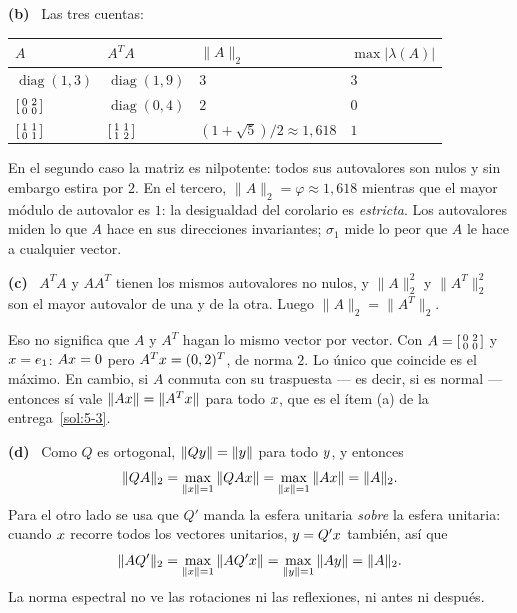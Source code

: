 \documentclass[11pt,a4paper]{article}
\newcommand{\bi}[1]{\boldsymbol{#1}}
\newcommand{\n}[1]{\boldsymbol{#1}}
\DeclareMathOperator{\gen}{span}
\DeclareMathOperator{\tr}{tr}
\DeclareMathOperator{\rg}{rg}
\DeclareMathOperator{\diag}{diag}
\def\n#1{#1}\def\bi#1{#1}\def\rg{rg}\def\tr{tr}\def\gen{span}%
\newcounter{entrega}[section]
\newcommand{\itemsol}[1]{\par\medskip\noindent\textbf{(#1)}\ \ignorespaces}
\begin{document}
\itemsol{b} Las tres cuentas:
\begin{center}
\begin{tabular}{@{}llll@{}}
\hline
$A$ & $A^TA$ & $\|A\|_2$ & $\max|\lambda(A)|$\\
\hline
$\diag(1,3)$ & $\diag(1,9)$ & $3$ & $3$\\
$\begin{bsmallmatrix}0&2\\0&0\end{bsmallmatrix}$ & $\diag(0,4)$ & $2$ & $0$\\
$\begin{bsmallmatrix}1&1\\0&1\end{bsmallmatrix}$ &
$\begin{bsmallmatrix}1&1\\1&2\end{bsmallmatrix}$ &
$(1+\sqrt5)/2\approx1{,}618$ & $1$\\
\hline
\end{tabular}
\end{center}
En el segundo caso la matriz es nilpotente: todos sus autovalores son nulos y sin
embargo estira por $2$. En el tercero, $\|A\|_2=\varphi\approx1{,}618$ mientras
que el mayor módulo de autovalor es $1$: la desigualdad del corolario es
\emph{estricta}. Los autovalores miden lo que $A$ hace en sus direcciones
invariantes; $\sigma_1$ mide lo peor que $A$ le hace a cualquier vector.

\itemsol{c} $A^TA$ y $AA^T$ tienen los mismos autovalores no nulos, y
$\|A\|_2^2$ y $\|A^T\|_2^2$ son el mayor autovalor de una y de la otra. Luego
$\|A\|_2=\|A^T\|_2$.

Eso no significa que $A$ y $A^T$ hagan lo mismo vector por vector. Con
$A=\begin{bsmallmatrix}0&2\\0&0\end{bsmallmatrix}$ y $\bx=\bi{e}_1$: $A\bx=\n0$
pero $A^T\bx=(0,2)^T$, de norma $2$. Lo único que coincide es el máximo. En
cambio, si $A$ conmuta con su traspuesta --- es decir, si es normal --- entonces
sí vale $\|A\bx\|=\|A^T\bx\|$ para todo $\bx$, que es el ítem (a) de la
entrega~\ref{sol:5-3}.

\itemsol{d} Como $Q$ es ortogonal, $\|Q\by\|=\|\by\|$ para todo $\by$, y entonces
\[
\|QA\|_2=\max_{\|\bx\|=1}\|QA\bx\|=\max_{\|\bx\|=1}\|A\bx\|=\|A\|_2 .
\]
Para el otro lado se usa que $Q'$ manda la esfera unitaria \emph{sobre} la esfera
unitaria: cuando $\bx$ recorre todos los vectores unitarios, $\by=Q'\bx$ también,
así que
\[
\|AQ'\|_2=\max_{\|\bx\|=1}\|AQ'\bx\|=\max_{\|\by\|=1}\|A\by\|=\|A\|_2 .
\]
La norma espectral no ve las rotaciones ni las reflexiones, ni antes ni después.
\end{document}
